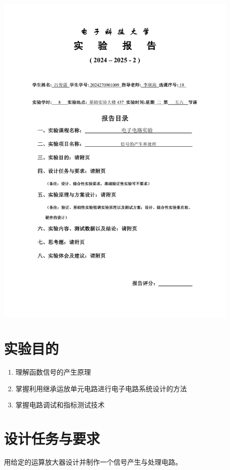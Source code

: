 \documentclass[12pt, a4paper]{article}
\begin{document}
\begin{titlepage}
    \centering
    \includegraphics[page=1, width=0.9\textwidth, keepaspectratio]{image/实验报告撰写封面.pdf}
    \restoregeometry
\end{titlepage}

\setcounter{section}{2}

\clearpage
\section{实验目的}
\begin{enumerate}[leftmargin=50pt, label=(\arabic*)]
    \item 理解函数信号的产生原理
    \item 掌握利用继承运放单元电路进行电子电路系统设计的方法
    \item 掌握电路调试和指标测试技术
\end{enumerate}

\section{设计任务与要求}
用给定的运算放大器设计并制作一个信号产生与处理电路。
\end{document}
